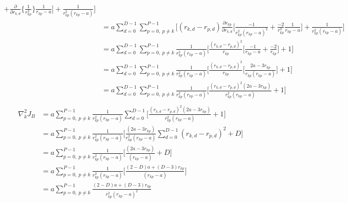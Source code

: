 \documentclass[12pt]{article}
\begin{document}
\begin{align*}
+\frac{\partial}{\partial r_{k,d}} \bigg\{ \frac{1}{r_{kp}^2}  \bigg\} \frac{1}{r_{kp}-a}
\bigg]
 + \frac{1}{r_{kp}^2(r_{kp}-a)}
\Bigg] \\
&= a \sum_{d=0}^{D-1} \sum_{p=0, \ p\neq k}^{P-1} \Bigg[ 
(r_{k,d}-r_{p,d}) \frac{\partial r_{kp}}{\partial r_{k,d}} 
\bigg[ 
\frac{-1}{r_{kp}^2(r_{kp}-a)^2}
+ \frac{-2}{r_{kp}^3} 
 \frac{1}{r_{kp}-a}\bigg]
 + \frac{1}{r_{kp}^2(r_{kp}-a)}
\Bigg] \\
&= a \sum_{d=0}^{D-1} \sum_{p=0, \ p\neq k}^{P-1}
\frac{1}{r_{kp}^2(r_{kp}-a)}
 \Bigg[ 
\frac{(r_{k,d}-r_{p,d})^2}{r_{kp}} 
\bigg[ 
\frac{-1}{r_{kp}-a}
+ \frac{-2}{r_{kp}} \bigg]
 + 1 \Bigg] \\
&= a \sum_{d=0}^{D-1} \sum_{p=0, \ p\neq k}^{P-1}
\frac{1}{r_{kp}^2(r_{kp}-a)}
 \Bigg[ 
\frac{(r_{k,d}-r_{p,d})^2}{r_{kp}} 
\bigg[ 
\frac{2a-3r_{kp}}{r_{kp}(r_{kp}-a)} \bigg]
 + 1 \Bigg] \\
&= a \sum_{d=0}^{D-1} \sum_{p=0, \ p\neq k}^{P-1}
\frac{1}{r_{kp}^2(r_{kp}-a)}
 \Bigg[ 
 \frac{(r_{k,d}-r_{p,d})^2 (2a-3r_{kp})}{r_{kp}^2(r_{kp}-a)}  + 1
 \Bigg] \\
\end{align*}
\begin{align*}
\nabla_k^2 J_B &= a  \sum_{p=0, \ p\neq k}^{P-1}
\frac{1}{r_{kp}^2(r_{kp}-a)}
\sum_{d=0}^{D-1} \Bigg[ 
 \frac{(r_{k,d}-r_{p,d})^2 (2a-3r_{kp})}{r_{kp}^2(r_{kp}-a)}  + 1
 \Bigg] \\
 &= a  \sum_{p=0, \ p\neq k}^{P-1}
\frac{1}{r_{kp}^2(r_{kp}-a)} \Bigg[ 
 \frac{(2a-3r_{kp})}{r_{kp}^2(r_{kp}-a)}\sum_{d=0}^{D-1} (r_{k,d}-r_{p,d})^2 + D
 \Bigg] \\
  &= a  \sum_{p=0, \ p\neq k}^{P-1}
\frac{1}{r_{kp}^2(r_{kp}-a)} \Bigg[ 
 \frac{(2a-3r_{kp})}{(r_{kp}-a)} + D
 \Bigg] \\
  &= a  \sum_{p=0, \ p\neq k}^{P-1}
\frac{1}{r_{kp}^2(r_{kp}-a)} \Bigg[ 
\frac{(2-D)a+(D-3)r_{kp}}{(r_{kp}-a)}
 \Bigg] \\
  &= a  \sum_{p=0, \ p\neq k}^{P-1}
\frac{(2-D)a+(D-3)r_{kp}}{r_{kp}^2(r_{kp}-a)^2} \\
\end{align*}
\end{document}
